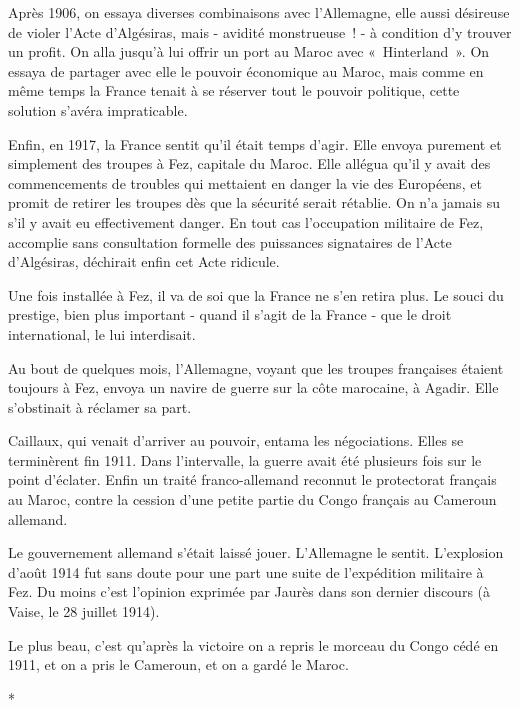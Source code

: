 \documentclass[french,twoside]{book} %
\begin{document}
Après 1906, on essaya diverses combinaisons avec l'Allemagne, elle aussi désireuse de violer l'Acte d'Algésiras, mais - avidité monstrueuse ! - à condi­tion d'y trouver un profit. On alla jusqu'à lui offrir un port au Maroc avec « Hinterland ». On essaya de partager avec elle le pouvoir économique au Maroc, mais comme en même temps la France tenait à se réserver tout le pouvoir politique, cette solution s'avéra impraticable.\par
Enfin, en 1917, la France sentit qu'il était temps d'agir. Elle envoya purement et simplement des troupes à Fez, capitale du Maroc. Elle allégua qu'il y avait des commencements de troubles qui mettaient en danger la vie des Européens, et promit de retirer les troupes dès que la sécurité serait rétablie. On n'a jamais su s'il y avait eu effectivement danger. En tout cas l'occupation militaire de Fez, accomplie sans consultation formelle des puissances signataires de l'Acte d'Algésiras, déchirait enfin cet Acte ridicule.\par
Une fois installée à Fez, il va de soi que la France ne s'en retira plus. Le souci du prestige, bien plus important - quand il s'agit de la France - que le droit international, le lui interdisait.\par
Au bout de quelques mois, l'Allemagne, voyant que les troupes françaises étaient toujours à Fez, envoya un navire de guerre sur la côte marocaine, à Agadir. Elle s'obstinait à réclamer sa part.\par
Caillaux, qui venait d'arriver au pouvoir, entama les négociations. Elles se terminèrent fin 1911. Dans l'intervalle, la guerre avait été plusieurs fois sur le point d'éclater. Enfin un traité franco-allemand reconnut le protectorat français au Maroc, contre la cession d'une petite partie du Congo français au Cameroun allemand.\par
Le gouvernement allemand s'était laissé jouer. L'Allemagne le sentit. L'explosion d'août 1914 fut sans doute pour une part une suite de l'expédition militaire à Fez. Du moins c'est l'opinion exprimée par Jaurès dans son dernier discours (à Vaise, le 28 juillet 1914).\par
Le plus beau, c'est qu'après la victoire on a repris le morceau du Congo cédé en 1911, et on a pris le Cameroun, et on a gardé le Maroc.\par

\begin{center}
\noindent \centerline{*}\par
\end{center}
\end{document}
